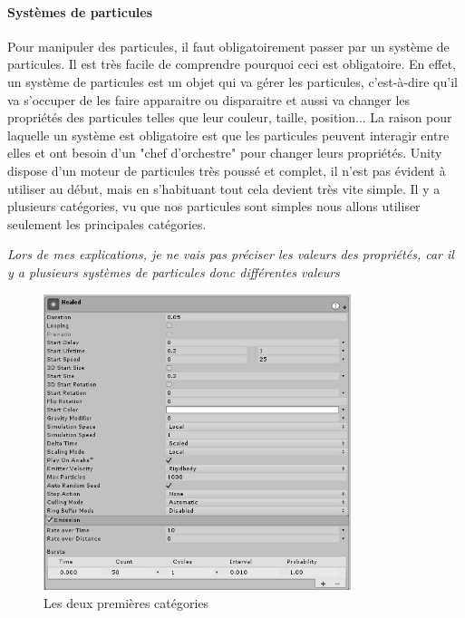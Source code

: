\documentclass{article}
\begin{document}
\paragraph{Systèmes de particules}


Pour manipuler des particules, il faut obligatoirement passer par un système de particules.
Il est très facile de comprendre pourquoi ceci est obligatoire. En effet, un système de particules est un objet qui va gérer les particules, c'est-à-dire qu'il va s'occuper de les faire apparaitre ou disparaitre et aussi va changer les propriétés des particules telles que leur couleur, taille, position... La raison pour laquelle un système est obligatoire est que les particules peuvent interagir entre elles et ont besoin d'un "chef d'orchestre" pour changer leurs propriétés.
Unity dispose d'un moteur de particules très poussé et complet, il n'est pas évident à utiliser au début, mais en s'habituant tout cela devient très vite simple. Il y a plusieurs catégories, vu que nos particules sont simples nous allons utiliser seulement les principales catégories.




\begin{center}
\emph{Lors de mes explications, je ne vais pas préciser les valeurs des propriétés, car il y a plusieurs systèmes de particules donc différentes valeurs}
\end{center}


\begin{figure}[H]
\centering
\includegraphics[width=0.8\textwidth]{cc/particles_main.png}
\caption{Les deux premières catégories}
\label{Les deux premières catégories}
\end{figure}
\end{document}
